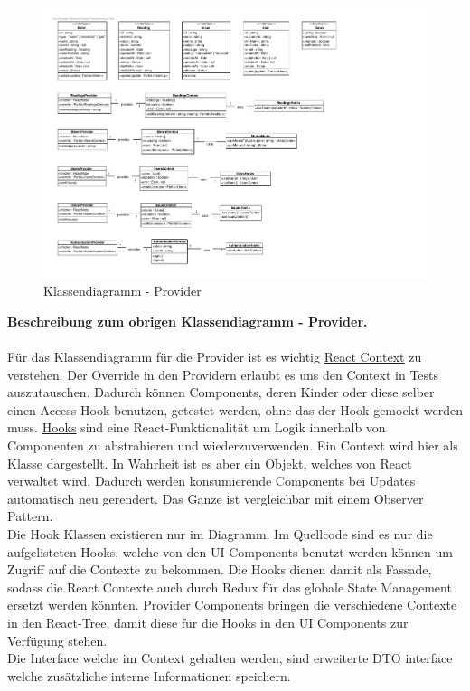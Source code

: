 \begin{figure}[H]
	\hspace{-3cm}
	\includegraphics[scale = 0.9]{./img/diagrams/providers-classDiagram}
	\caption{Klassendiagramm - Provider}
\end{figure}
\newpage

\textbf{Beschreibung zum obrigen Klassendiagramm - Provider.} \\ \\
Für das Klassendiagramm für die Provider ist es wichtig \href{https://reactjs.org/docs/context.html}{React Context} zu verstehen.  Der Override in den Providern erlaubt es uns den Context in Tests auszutauschen. Dadurch können Components, deren Kinder oder diese selber einen Access Hook  benutzen, 
getestet werden, ohne das der Hook gemockt werden muss. \href{https://reactjs.org/docs/hooks-intro.html}{Hooks} sind eine React-Funktionalität um Logik innerhalb von Componenten zu abstrahieren und wiederzuverwenden. Ein Context wird hier als Klasse dargestellt. In Wahrheit ist es aber ein Objekt, 
welches von React verwaltet wird. Dadurch werden konsumierende Components bei Updates automatisch neu gerendert. Das Ganze ist vergleichbar mit einem Observer Pattern. \\
Die Hook Klassen existieren nur im Diagramm. Im Quellcode sind es nur die aufgelisteten Hooks, welche von den UI Components benutzt werden können um Zugriff auf die Contexte zu bekommen. Die Hooks dienen damit als Fassade, sodass die React Contexte auch durch Redux für das globale State Management ersetzt werden könnten.
Provider Components bringen die verschiedene Contexte in den React-Tree, damit diese für die Hooks in den UI Components zur Verfügung stehen.\\
Die Interface welche im Context gehalten werden, sind erweiterte DTO interface welche zusätzliche interne Informationen speichern.

